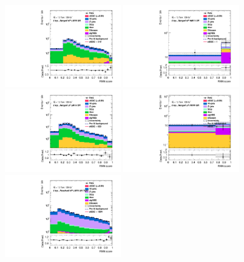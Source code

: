 \begin{figure}[]
    \centering
    \includegraphics[width=0.45\textwidth]{figures/aQGC/PostFit/Region_distRNN_DSRVBSHPLMtvvJ1050_BMin0_J0_incJet1_L0_T0_incFat1_Y6051_incTag1_Fat1_GlobalFit_unconditionnal_mu1log}
    \includegraphics[width=0.45\textwidth]{figures/aQGC/PostFit/Region_distRNN_DSRVBSHPHMtvvJ1050_BMin0_J0_incJet1_L0_T0_incFat1_Y6051_incTag1_Fat1_GlobalFit_unconditionnal_mu1log}    \includegraphics[width=0.45\textwidth]{figures/aQGC/PostFit/Region_distRNN_DSRVBSLPLMtvvJ1200_BMin0_J0_incJet1_L0_T0_incFat1_Y6051_incTag1_Fat1_GlobalFit_unconditionnal_mu1log}     \includegraphics[width=0.45\textwidth]{figures/aQGC/PostFit/Region_distRNN_DSRVBSLPHMtvvJ1200_BMin0_J0_incJet1_L0_T0_incFat1_Y6051_incTag1_Fat1_GlobalFit_unconditionnal_mu1log}    \includegraphics[width=0.45\textwidth]{figures/aQGC/PostFit/Region_distRNN_DSRVBSFidLMtvvjj1200_BMin0_T0_Y6051_incTag1_J2_L0_incJet1_GlobalFit_unconditionnal_mu1log}

\end{figure}
